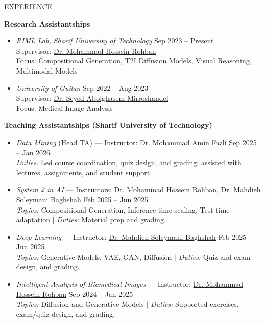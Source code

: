 \documentclass[]{CV}
\begin{document}
\begin{section}{EXPERIENCE}

\textbf{Research Assistantships}
\begin{itemize}
    \item \textit{RIML Lab, Sharif University of Technology} \hfill Sep 2023 -- Present \\
    Supervisor: \href{https://scholar.google.com/citations?user=pRyJ6FkAAAAJ}{Dr. Mohammad Hossein Rohban} \\
    Focus: Compositional Generation, T2I Diffusion Models, Visual Reasoning, Multimodal Models

    
    \item \textit{University of Guilan} \hfill Sep 2022 -- Aug 2023 \\
    Supervisor: \href{https://scholar.google.com/citations?user=Qh5IJ94AAAAJ}{Dr. Seyed Abolghasem Mirroshandel} \\
    Focus: Medical Image Analysis
\end{itemize}

\textbf{Teaching Assistantships (Sharif University of Technology)}
\begin{itemize}
    \item \textit{Data Mining} (Head TA) --- Instructor: \href{https://scholar.google.com/citations?user=veo-8swAAAAJ}{Dr. Mohammad Amin Fazli} \hfill Sep 2025 -- Jan 2026 \\
    \textit{Duties:} Led course coordination, quiz design, and grading; assisted with lectures, assignments, and student support.

    \item \textit{System 2 in AI} --- Instructors: \href{https://scholar.google.com/citations?user=pRyJ6FkAAAAJ}{Dr. Mohammad Hossein Rohban}, \href{https://scholar.google.com/citations?user=S1U0KlgAAAAJ}{Dr. Mahdieh Soleymani Baghshah} \hfill Feb 2025 -- Jun 2025 \\
    \textit{Topics:} Compositional Generation, Inference-time scaling, Test-time adaptation $\mid$ \textit{Duties:} Material prep and grading.

    \item \textit{Deep Learning} --- Instructor: \href{https://scholar.google.com/citations?user=S1U0KlgAAAAJ}{Dr. Mahdieh Soleymani Baghshah} \hfill Feb 2025 -- Jun 2025 \\
    \textit{Topics:} Generative Models, VAE, GAN, Diffusion $\mid$ \textit{Duties:} Quiz and exam design, and grading.

    \item \textit{Intelligent Analysis of Biomedical Images} --- Instructor: \href{https://scholar.google.com/citations?user=pRyJ6FkAAAAJ}{Dr. Mohammad Hossein Rohban} \hfill Sep 2024 -- Jan 2025 \\
    \textit{Topics:} Diffusion and Generative Models $\mid$ \textit{Duties:} Supported exercises, exam/quiz design, and grading.
\end{itemize}

\end{section}
\end{document}
